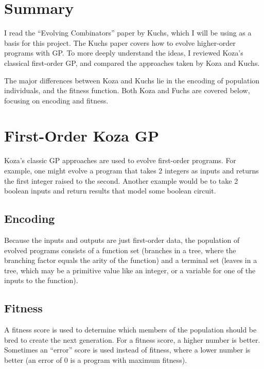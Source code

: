 \documentclass{article}
\begin{document}
\maketitle

\section{Summary}

I read the ``Evolving Combinators'' paper by Kuchs, which I will be
using as a basis for this project. The Kuchs paper covers how to
evolve higher-order programs with GP. To more deeply understand the
ideas, I reviewed Koza's classical first-order GP, and compared the
approaches taken by Koza and Kuchs.

The major differences between Koza and Kuchs lie in the encoding of
population individuals, and the fitness function. Both Koza and Fuchs
are covered below, focusing on encoding and fitness.

\section{First-Order Koza GP}

Koza's classic GP approaches are used to evolve first-order programs.
For example, one might evolve a program that takes 2 integers as
inputs and returns the first integer raised to the second. Another
example would be to take 2 boolean inputs and return results
that model some boolean circuit.

\subsection{Encoding}

Because the inputs and outputs are
just first-order data, the population of evolved programs consists of
a function set (branches in a tree, where the branching factor equals
the arity of the function) and a terminal set (leaves in a tree, which
may be a primitive value like an integer, or a variable for one of the
inputs to the function). 

\subsection{Fitness}

A fitness score is used to determine which members of the population
should be bred to create the next generation. For a fitness score,
a higher number is better. Sometimes an ``error'' score is used
instead of fitness, where a lower number is better (an error of 0 is
a program with maximum fitness).
\end{document}
